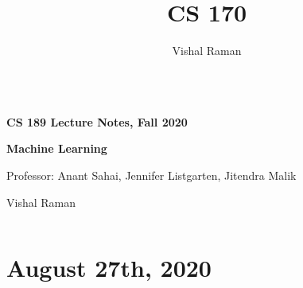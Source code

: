 \documentclass[11pt]{scrartcl}
\begin{document}
\title{CS 170}
\author{Vishal Raman}
\thispagestyle{empty}
$ $
\vfill
\begin{center}

\centerline{\huge \textbf{CS 189 Lecture Notes, Fall 2020}}
\centerline{\Large \textbf{Machine Learning} } 
\centerline{Professor: Anant Sahai, Jennifer Listgarten, Jitendra Malik}
\centerline{Vishal Raman}
\end{center}
\vfill
$ $
\newpage
\thispagestyle{empty}
\tableofcontents
\newpage
\section{August 27th, 2020}
\end{document}

